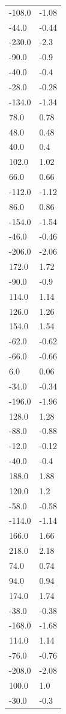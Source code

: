 \begin{longtable}{ll}
-108.0 & -1.08 \\
-44.0 & -0.44 \\
-230.0 & -2.3 \\
-90.0 & -0.9 \\
-40.0 & -0.4 \\
-28.0 & -0.28 \\
-134.0 & -1.34 \\
78.0 & 0.78 \\
48.0 & 0.48 \\
40.0 & 0.4 \\
102.0 & 1.02 \\
66.0 & 0.66 \\
-112.0 & -1.12 \\
86.0 & 0.86 \\
-154.0 & -1.54 \\
-46.0 & -0.46 \\
-206.0 & -2.06 \\
172.0 & 1.72 \\
-90.0 & -0.9 \\
114.0 & 1.14 \\
126.0 & 1.26 \\
154.0 & 1.54 \\
-62.0 & -0.62 \\
-66.0 & -0.66 \\
6.0 & 0.06 \\
-34.0 & -0.34 \\
-196.0 & -1.96 \\
128.0 & 1.28 \\
-88.0 & -0.88 \\
-12.0 & -0.12 \\
-40.0 & -0.4 \\
188.0 & 1.88 \\
120.0 & 1.2 \\
-58.0 & -0.58 \\
-114.0 & -1.14 \\
166.0 & 1.66 \\
218.0 & 2.18 \\
74.0 & 0.74 \\
94.0 & 0.94 \\
174.0 & 1.74 \\
-38.0 & -0.38 \\
-168.0 & -1.68 \\
114.0 & 1.14 \\
-76.0 & -0.76 \\
-208.0 & -2.08 \\
100.0 & 1.0 \\
-30.0 & -0.3 \\

\end{longtable}
